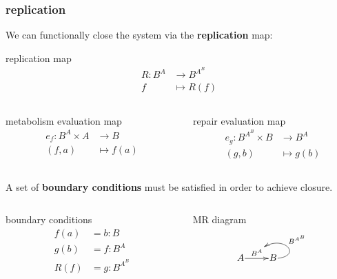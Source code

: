 \begin{frame}
\frametitle{replication}
We can functionally close the system via the \textbf{replication} map:
\begin{block}{replication map}
\abovedisplayskip=0pt
\begin{align*}
R: B^A & \longrightarrow B^{A^B}\\
f & \longmapsto R(f)
\end{align*}
\end{block}
 \begin{columns}
    \begin{column}{0.5\textwidth}
      \begin{block}{metabolism evaluation map}
		\abovedisplayskip=0pt
		\begin{align*}
		e_f : B^A \times A &\longrightarrow B\\
		(f,a) & \longmapsto f(a)
		\end{align*}
		\end{block}
    \end{column}
    \begin{column}{0.5\textwidth}
		\begin{block}{repair evaluation map}
			\abovedisplayskip=0pt
			\begin{align*}
			e_g: B^{A^B} \times B &\longrightarrow B^A\\
	    			            (g,b) & \longmapsto    g(b)
			\end{align*}
		\end{block}
    \end{column}
\end{columns}
\end{frame}

\begin{frame}
A set of \textbf{boundary conditions} must be satisfied in order to achieve closure.

\begin{columns}[t]
   \begin{column}{0.5\textwidth}
		\begin{block}{boundary conditions}
		\abovedisplayskip=0pt
			\begin{align*}
			f(a) &= b : B\\
			g(b) &= f : B^A\\
			R(f) &= g : B^{A^B}
			\end{align*}
		\end{block}
	\end{column}
	\begin{column}{0.5\textwidth}
		\begin{block}{MR diagram}
		\abovedisplayskip=0pt
		$$	\xymatrix@1{
			A \ar[r]^{B^A}="ba" & B \ar@(r,ur)_(.5) {B^{A^B}} [];"ba"}$$
		\end{block}
	\end{column}
\end{columns}
\end{frame}